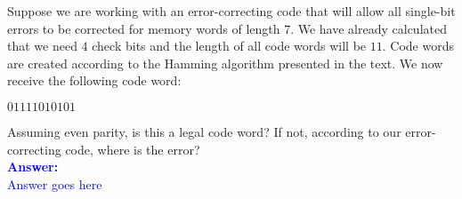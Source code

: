 \item{}
Suppose we are working with an error-correcting code that will allow all
single-bit errors to be corrected for memory words of length $7$. We have
already calculated that we need $4$ check bits and the length of all code words
will be $11$. Code words are created according to the Hamming algorithm
presented in the text. We now receive the following code word:
\begin{center}$01111010101$\\[6pt]\end{center}
Assuming even parity, is this a legal code word? If not, according to our
error-correcting code, where is the error?\\[12pt]
\ifanswers
\textcolor{blue}{
\textbf{Answer:}\\
Answer goes here
}
\newpage
\fi

